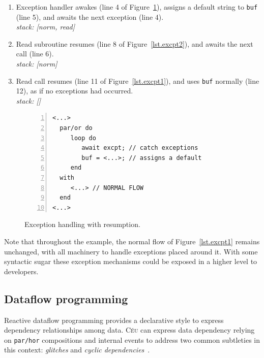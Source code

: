\documentclass{acm_proc_article-sp}
\newcommand{\CEU}{\textsc{C\'{e}u}\xspace}
\newcommand{\code}[1] {{\small{\texttt{#1}}}}
\newcommand{\1}{\;}
\newcommand{\2}{\;\;}
\newcommand{\3}{\;\;\;}
\newcommand{\5}{\;\;\;\;\;}
\begin{document}
{\small
\begin{enumerate}[start=3]
\setlength{\itemsep}{0pt}
\item Exception handler awakes (line 4 of Figure~\ref{lst.excpt4}), assigns a 
default string to \code{buf} (line 5), and awaits the next exception (line 4).  \\
    \emph{stack: [norm, read]}
\item Read subroutine resumes (line 8 of Figure~\ref{lst.excpt2}), and awaits 
the next call (line 6). \\
    \emph{stack: [norm]}
\item Read call resumes (line 11 of Figure~\ref{lst.excpt1}), and uses 
\code{buf} normally (line 12), as if no exceptions had occurred. \\
    \emph{stack: []}
\end{enumerate}
}

\begin{figure}[t]
\begin{lstlisting}[numbers=left,xleftmargin=2em]
<...>
  par/or do
     loop do
        await excpt; // catch exceptions
        buf = <...>; // assigns a default
     end
  with
     <...> // NORMAL FLOW
  end
<...>
\end{lstlisting}
\caption{ Exception handling with resumption.
\label{lst.excpt4}
}
\end{figure}

Note that throughout the example, the normal flow of Figure~\ref{lst.excpt1} 
remains unchanged, with all machinery to handle exceptions placed around it.
With some syntactic sugar these exception mechanisms could be exposed in a 
higher level to developers.

\subsection{Dataflow programming}
\label{sec.adv.frp}

Reactive dataflow programming provides a declarative style to express 
dependency relationships among data.
%
\CEU can express data dependency relying on \code{par/hor} compositions and 
internal events to address two common subtleties in this context: 
\emph{glitches} and \emph{cyclic dependencies}~\cite{frp.survey}.
\end{document}
